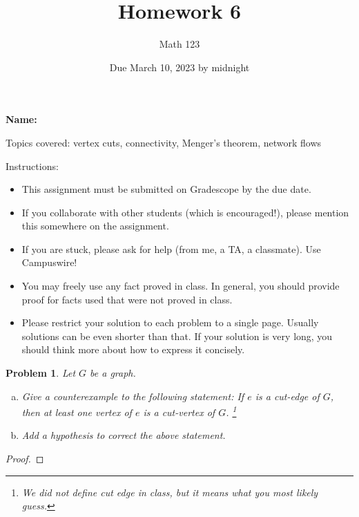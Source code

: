 \documentclass[11pt]{article}
\author{Math 123}
\date{Due March 10, 2023 by midnight}
\title{Homework 6}
\newtheorem{problem}{Problem}
\begin{document}
\maketitle

{\bf\Large Name:} 


\vspace{.3in}
Topics covered: vertex cuts, connectivity, Menger's theorem, network flows

Instructions: 
\begin{itemize}
\item This assignment must be submitted on Gradescope by the due date. 
\item If you collaborate with other students (which is encouraged!), please mention this somewhere on the assignment. 
\item If you are stuck, please ask for help (from me, a TA, a classmate). Use Campuswire!  
\item You may freely use any fact proved in class. In general, you should provide proof for facts used that were not proved in class. 
\item Please restrict your solution to each problem to a single page. Usually solutions can be even shorter than that. If your solution is very long, you should think more about how to express it concisely.
\end{itemize}

\pagebreak 


\begin{problem}
Let $G$ be a graph. 
\begin{enumerate}[(a)]
\item Give a counterexample to the following statement: If $e$ is a cut-edge of $G$, then at least one vertex of $e$ is a cut-vertex of $G$. \footnote{We did not define cut edge in class, but it means what you most likely guess.} 
\item Add a hypothesis to correct the above statement. 
\end{enumerate} 
\end{problem}

\begin{proof}

\end{proof}
\end{document}
